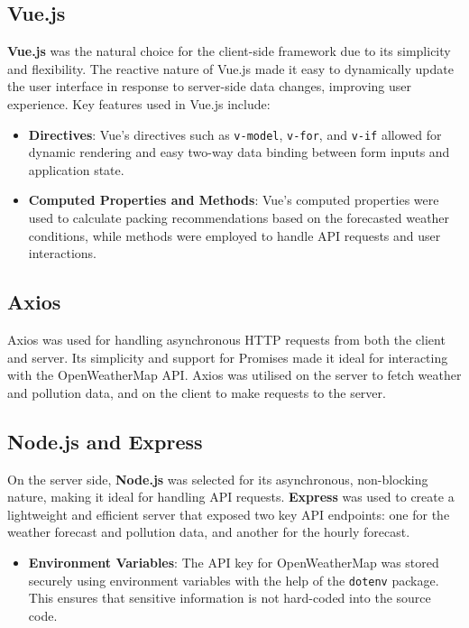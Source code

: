 \documentclass{article}
\begin{document}
\subsection*{Vue.js}

\textbf{Vue.js} was the natural choice for the client-side framework due to its simplicity and flexibility. The reactive nature of Vue.js made it easy to dynamically update the user interface in response to server-side data changes, improving user experience. Key features used in Vue.js include:

\begin{itemize}
    \item \textbf{Directives}: Vue's directives such as \texttt{v-model}, \texttt{v-for}, and \texttt{v-if} allowed for dynamic rendering and easy two-way data binding between form inputs and application state.
    
    \item \textbf{Computed Properties and Methods}: Vue's computed properties were used to calculate packing recommendations based on the forecasted weather conditions, while methods were employed to handle API requests and user interactions.
\end{itemize}

\subsection*{Axios}

Axios was used for handling asynchronous HTTP requests from both the client and server. Its simplicity and support for Promises made it ideal for interacting with the OpenWeatherMap API. Axios was utilised on the server to fetch weather and pollution data, and on the client to make requests to the server.

\subsection*{Node.js and Express}

On the server side, \textbf{Node.js} was selected for its asynchronous, non-blocking nature, making it ideal for handling API requests. \textbf{Express} was used to create a lightweight and efficient server that exposed two key API endpoints: one for the weather forecast and pollution data, and another for the hourly forecast.

\begin{itemize}
    \item \textbf{Environment Variables}: The API key for OpenWeatherMap was stored securely using environment variables with the help of the \texttt{dotenv} package. This ensures that sensitive information is not hard-coded into the source code.
\end{itemize}
\end{document}
